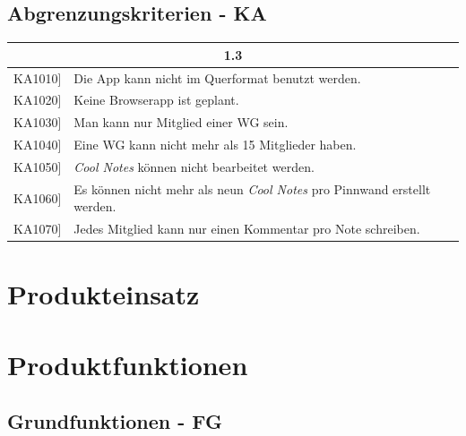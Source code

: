 \documentclass[a4paper]{scrreprt}
\begin{document}
		\vspace{1cm}
		\clearpage
		
        \section{Abgrenzungskriterien - KA}
        
        \begin{table}[h!]
        	\centering
        	\label{my-label}
        	\begin{tabular}{p{2cm}p{12cm}}
        		
        		\multicolumn{2}{c}{\textbf{1.3}} \\ \hline
        		\centering{[}KA1010{]} & Die App kann nicht im Querformat benutzt werden.\\
        		\centering{[}KA1020{]}& Keine Browserapp ist geplant.                                 \\
        		\centering{[}KA1030{]}& Man kann nur Mitglied einer WG sein.\\ 
        		\centering{[}KA1040{]}& Eine WG kann nicht mehr als 15 Mitglieder haben.\\ 
        		\centering{[}KA1050{]}& \textit{Cool Notes} können nicht bearbeitet werden.\\ 
        		\centering{[}KA1060{]}& Es können nicht mehr als neun \textit{Cool Notes} pro Pinnwand erstellt werden.\\ 
        		\centering{[}KA1070{]}& Jedes Mitglied kann nur einen Kommentar pro Note schreiben.\\ 
        		\hline
        	\end{tabular}
        \end{table}

    \chapter{Produkteinsatz}
    
        

    \chapter{Produktfunktionen}
    		\section{Grundfunktionen - FG}
    		
\end{document}
